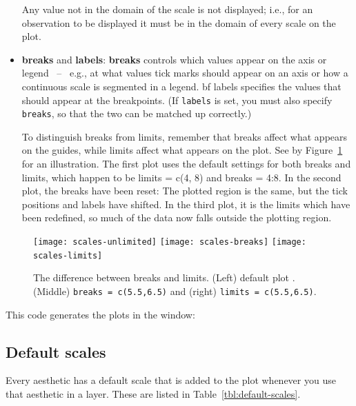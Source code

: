 \begin{itemize}
  Any value not in the domain of the scale is not displayed; i.e., for an observation to be displayed it must be in the domain of every scale on the plot.

  \item {\bf breaks} and {\bf labels}: {\bf breaks} controls which values appear on the axis or legend ~--~ e.g., at what values tick marks should appear on an axis or how a continuous scale is segmented in a legend.  {bf labels} specifies the values that should appear at the breakpoints. (If {\tt labels} is set, you must also specify {\tt breaks}, so that the two can be matched up correctly.)  

To distinguish breaks from limits, remember that breaks affect what appears on the guides, while limits affect what appears on the plot.  See by Figure~\ref{fig:breaks_vs_legends} for an illustration.  The first plot uses the default settings for both breaks and limits, which happen to be limits = c(4, 8) and breaks = 4:8.  In the second plot, the breaks have been reset: The plotted region is the same, but the tick positions and labels have shifted.  In the third plot, it is the limits which have been redefined, so much of the data now falls outside the plotting region. 
\end{itemize}

\begin{figure}[htbp]
  \centering
    \texttt{[image: scales-unlimited]}%
    \texttt{[image: scales-breaks]}%
    \texttt{[image: scales-limits]}
  \caption{The difference between breaks and limits.  (Left) default plot .  (Middle)  {\tt breaks = c(5.5,6.5)} and (right) {\tt limits = c(5.5,6.5)}.}
  \label{fig:breaks_vs_legends}
\end{figure}

This code generates the plots in the window:



\subsection{Default scales}
\label{sub:default_scales}

Every aesthetic has a default scale that is added to the plot whenever you use that aesthetic in a layer.  These are listed in Table~\ref{tbl:default-scales}.

